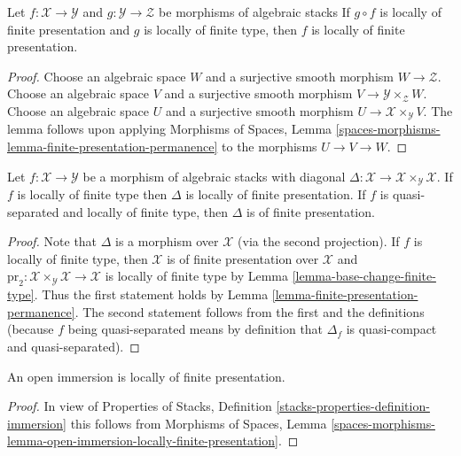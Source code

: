 \begin{lemma}
\label{lemma-finite-presentation-permanence}
Let $f : \mathcal{X} \to \mathcal{Y}$ and
$g : \mathcal{Y} \to \mathcal{Z}$ be morphisms of algebraic stacks
If $g \circ f$ is locally of finite presentation and $g$ is locally of
finite type, then $f$ is locally of finite presentation.
\end{lemma}

\begin{proof}
Choose an algebraic space $W$ and a surjective smooth morphism
$W \to \mathcal{Z}$.
Choose an algebraic space $V$ and a surjective smooth morphism
$V \to \mathcal{Y} \times_\mathcal{Z} W$.
Choose an algebraic space $U$ and a surjective smooth morphism
$U \to \mathcal{X} \times_\mathcal{Y} V$.
The lemma follows upon applying
Morphisms of Spaces, Lemma
\ref{spaces-morphisms-lemma-finite-presentation-permanence}
to the morphisms $U \to V \to W$.
\end{proof}

\begin{lemma}
\label{lemma-diagonal-morphism-finite-type}
Let $f : \mathcal{X} \to \mathcal{Y}$ be a morphism of algebraic stacks
with diagonal
$\Delta : \mathcal{X} \to \mathcal{X} \times_\mathcal{Y} \mathcal{X}$.
If $f$ is locally of finite type then $\Delta$ is
locally of finite presentation. If $f$ is
quasi-separated and locally of finite type, then $\Delta$ is of finite
presentation.
\end{lemma}

\begin{proof}
Note that $\Delta$ is a morphism over $\mathcal{X}$ (via the second
projection). If $f$ is locally of finite type, then
$\mathcal{X}$ is of finite presentation over $\mathcal{X}$ and
$\text{pr}_2 : \mathcal{X} \times_\mathcal{Y} \mathcal{X} \to \mathcal{X}$
is locally of finite type by Lemma \ref{lemma-base-change-finite-type}.
Thus the first statement holds by
Lemma \ref{lemma-finite-presentation-permanence}.
The second statement follows from the first and
the definitions (because $f$ being quasi-separated means
by definition that $\Delta_f$ is quasi-compact and quasi-separated).
\end{proof}

\begin{lemma}
\label{lemma-open-immersion-locally-finite-presentation}
An open immersion is locally of finite presentation.
\end{lemma}

\begin{proof}
In view of Properties of Stacks, Definition
\ref{stacks-properties-definition-immersion}
this follows from
Morphisms of Spaces,
Lemma \ref{spaces-morphisms-lemma-open-immersion-locally-finite-presentation}.
\end{proof}

